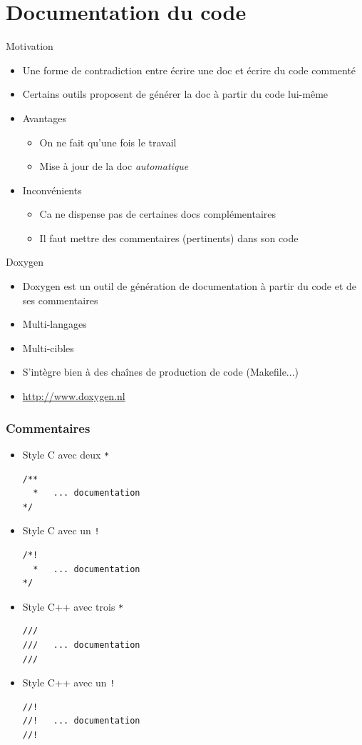 \section{Documentation du code}

\begin{frame}{Motivation}
\begin{itemize}
\item Une forme de contradiction entre écrire une doc et écrire du code commenté
\item Certains outils proposent de générer la doc à partir du code lui-même
\item Avantages
\begin{itemize}
\item On ne fait qu'une fois le travail
\item Mise à jour de la doc \textit{automatique}
\end{itemize}
\item Inconvénients 
\begin{itemize}
\item Ca ne dispense pas de certaines docs complémentaires
\item Il faut mettre des commentaires (pertinents) dans son code
\end{itemize}
\end{itemize}
\end{frame}

\begin{frame}{Doxygen}
\begin{itemize}
\item Doxygen est un outil de génération de documentation à partir du code et de ses commentaires
\item Multi-langages 
\item Multi-cibles 
\item S'intègre bien à des chaînes de production de code (Makefile...)
\item \url{http://www.doxygen.nl}
\end{itemize}
\end{frame}

\begin{frame}[fragile]
\frametitle{Commentaires}
\begin{itemize}
\item Style C avec deux \texttt{*}
\begin{lstlisting}
/** 
  *   ... documentation 
*/
\end{lstlisting}
\item Style C avec un \texttt{!}
\begin{lstlisting}
/*! 
  *   ... documentation 
*/
\end{lstlisting}
\item Style C++ avec trois \texttt{*}
\begin{lstlisting}
/// 
///   ... documentation 
///
\end{lstlisting}
\item Style C++ avec un \texttt{!}
\begin{lstlisting}
//! 
//!   ... documentation 
//!
\end{lstlisting}
\end{itemize}
\end{frame}

